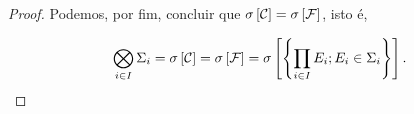 \begin{proof}
    Podemos, por fim, concluir que $\sigma \left[\mathcal{C}\right]=\sigma \left[\mathcal{F}\right]$, isto é, 

    \begin{equation*}
        \bigotimes_{i\in I} \Sigma_i=\sigma \left[\mathcal{C}\right]=\sigma \left[\mathcal{F}\right]=\sigma \left[\left\{\prod_{i\in I} E_i; E_i\in \Sigma_i\right\}\right].
    \end{equation*}
\end{proof}